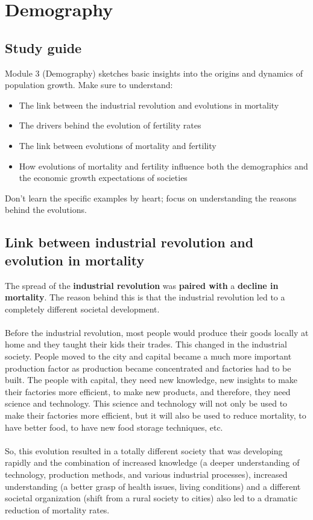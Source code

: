 \documentclass[../summary.tex]{subfiles}
\begin{document}
	
	\section{Demography}
	
	\subsection{Study guide}
	
	Module 3 (Demography) sketches basic insights into the origins and dynamics of population growth. Make sure to understand:
	\begin{itemize}
		\setlength{\itemsep}{0pt}
		\item The link between the industrial revolution and evolutions in mortality
		\item The drivers behind the evolution of fertility rates
		\item The link between evolutions of mortality and fertility
		\item How evolutions of mortality and fertility influence both the demographics and the economic
		growth expectations of societies
	\end{itemize}
	Don’t learn the specific examples by heart; focus on understanding the reasons behind the evolutions.
	
	\subsection{Link between industrial revolution and evolution in mortality}
	The spread of the \textbf{industrial revolution} was \textbf{paired with} a \textbf{decline in mortality}. The reason behind this is that the industrial revolution led to a completely different societal development. 
	\\
	\\
	Before the industrial revolution, most people would produce their goods locally at home and they taught their kids their trades. This changed in the industrial society. People moved to the city and capital became a much more important production factor as production became concentrated and factories had to be built. The people with capital, they need new knowledge, new insights to make their factories more efficient, to make new products, and therefore, they need science and technology. This science and technology will not only be used to make their factories more efficient, but it will also be used to reduce mortality, to have better food, to have new food storage techniques, etc. 
	\\
	\\
	So, this evolution resulted in a totally different society that was developing rapidly and the combination of increased knowledge (a deeper understanding of technology, production methods, and various industrial processes), increased understanding (a better grasp of health issues, living conditions) and a different societal organization (shift from a rural society to cities) also led to a dramatic reduction of mortality rates. 
	
\end{document}

